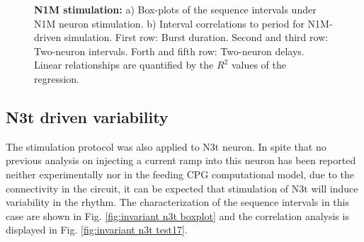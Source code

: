 \begin{figure}[hbt!]
\begin{minipage}[b]{0.53\textwidth}
\begin{minipage}[b]{\textwidth}
		\end{minipage}
	\end{minipage}
	\caption{\textbf{N1M stimulation:} a) Box-plots of the  sequence intervals under N1M neuron stimulation. b) Interval correlations to period for N1M-driven simulation. First row: Burst duration. Second and third row: Two-neuron intervals. Forth and fifth row: Two-neuron delays. Linear relationships are quantified by the $R^2$ values of the regression.}
	\label{fig:invariant n1m}
\end{figure}





%
%      
%
%

\subsection{N3t driven variability}
\label{subsec:n3t driven}

The stimulation protocol was also applied to N3t neuron. In spite that no previous analysis on injecting a current ramp into this neuron has been reported neither experimentally nor in the feeding CPG computational model, due to the connectivity in the circuit, it can be expected that stimulation of N3t will induce variability in the rhythm. The characterization of the sequence intervals in this case are shown in Fig. 
\ref{fig:invariant n3t boxplot} and the correlation analysis is displayed in Fig. \ref{fig:invariant n3t test17}.


